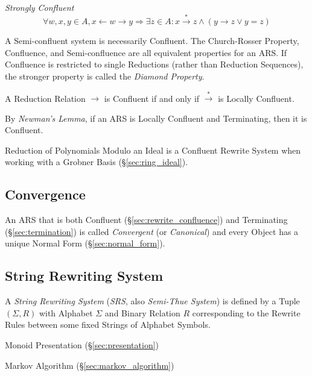 \emph{Strongly Confluent}
\[
  \forall w,x,y \in A,
  x \leftarrow w \rightarrow y \Rightarrow
  \exists z \in A : x \stackrel{*}\rightarrow z \wedge
  (y \rightarrow z \vee y = z)
\]

A Semi-confluent system is necessarily Confluent. The Church-Rosser
Property, Confluence, and Semi-confluence are all equivalent
properties for an ARS. If Confluence is restricted to single
Reductions (rather than Reduction Sequences), the stronger property is
called the \emph{Diamond Property}.

A Reduction Relation $\rightarrow$ is Confluent if and only if
$\stackrel{*}\rightarrow$ is Locally Confluent.

By \emph{Newman's Lemma}, if an ARS is Locally Confluent and
Terminating, then it is Confluent.

Reduction of Polynomials Modulo an Ideal is a Confluent Rewrite System
when working with a Grobner Basis (\S\ref{sec:ring_ideal}).



\subsection{Convergence}\label{sec:rewrite_convergence}

An ARS that is both Confluent (\S\ref{sec:rewrite_confluence}) and
Terminating (\S\ref{sec:termination}) is called \emph{Convergent} (or
\emph{Canonical}) and every Object has a unique Normal Form
(\S\ref{sec:normal_form}).



\subsection{String Rewriting System}\label{sec:string_rewriting}

A \emph{String Rewriting System} (\emph{SRS}, also \emph{Semi-Thue
  System}) is defined by a Tuple $(\Sigma, R)$ with Alphabet $\Sigma$
and Binary Relation $R$ corresponding to the Rewrite Rules between
some fixed Strings of Alphabet Symbols.

Monoid Presentation (\S\ref{sec:presentation})

Markov Algorithm (\S\ref{sec:markov_algorithm})



